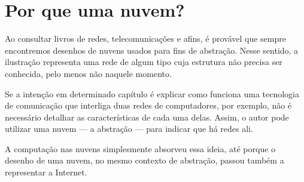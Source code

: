 \section{Por que uma nuvem?}

Ao consultar livros de redes, telecomunicações e afins, é provável que sempre
encontremos desenhos de nuvens usados para fins de abstração. Nesse sentido, a
ilustração representa uma rede de algum tipo cuja estrutura não precisa ser
conhecida, pelo menos não naquele momento.

Se a intenção em determinado capítulo é explicar como funciona uma tecnologia de
comunicação que interliga duas redes de computadores, por exemplo, não é
necessário detalhar as características de cada uma delas. Assim, o autor pode
utilizar uma nuvem --- a abstração --- para indicar que há redes ali.

A computação nas nuvens simplesmente absorveu essa ideia, até porque o desenho de
uma nuvem, no mesmo contexto de abstração, passou também a representar a
Internet.
